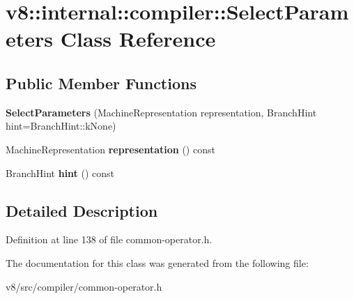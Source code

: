 \hypertarget{classv8_1_1internal_1_1compiler_1_1SelectParameters}{}\section{v8\+:\+:internal\+:\+:compiler\+:\+:Select\+Parameters Class Reference}
\label{classv8_1_1internal_1_1compiler_1_1SelectParameters}
\subsection*{Public Member Functions}
\begin{DoxyCompactItemize}
\item 
\mbox{\label{classv8_1_1internal_1_1compiler_1_1SelectParameters_ace7b2e55e0ed31d8089fe4637f78dd35}} 
{\bfseries Select\+Parameters} (Machine\+Representation representation, Branch\+Hint hint=Branch\+Hint\+::k\+None)
\item 
\mbox{\label{classv8_1_1internal_1_1compiler_1_1SelectParameters_a378e021b6fe43cd189ed01a04376a3cf}} 
Machine\+Representation {\bfseries representation} () const
\item 
\mbox{\label{classv8_1_1internal_1_1compiler_1_1SelectParameters_a3e8da9cf418a45dbc42f6c495e9e2090}} 
Branch\+Hint {\bfseries hint} () const
\end{DoxyCompactItemize}


\subsection{Detailed Description}


Definition at line 138 of file common-\/operator.\+h.



The documentation for this class was generated from the following file\+:\begin{DoxyCompactItemize}
\item 
v8/src/compiler/common-\/operator.\+h\end{DoxyCompactItemize}
